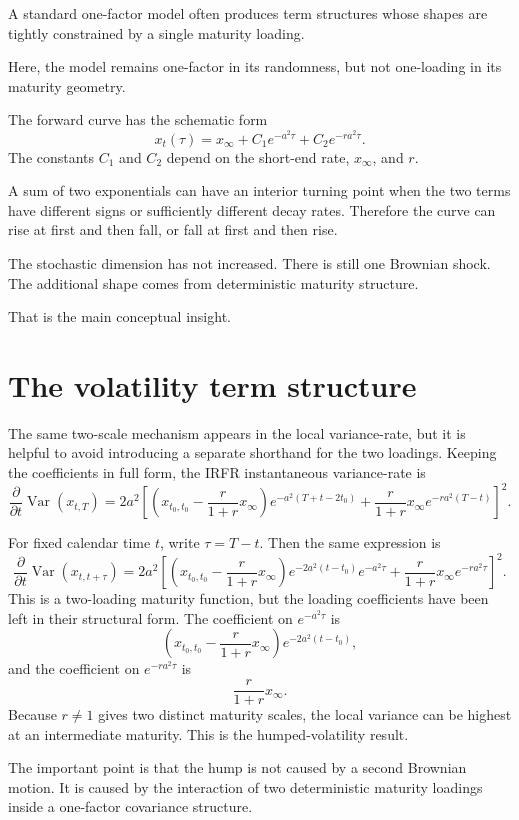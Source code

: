 \documentclass[11pt]{article}
\theoremstyle{plainbreak}
\begin{document}
A standard one-factor model often produces term structures whose shapes are tightly constrained by a single maturity loading.

Here, the model remains one-factor in its randomness, but not one-loading in its maturity geometry.

The forward curve has the schematic form
\[
x_t(\tau)=x_\infty+C_1 e^{-a^2\tau}+C_2 e^{-ra^2\tau}.
\]
The constants \(C_1\) and \(C_2\) depend on the short-end rate, \(x_\infty\), and \(r\).

A sum of two exponentials can have an interior turning point when the two terms have different signs or sufficiently different decay rates. Therefore the curve can rise at first and then fall, or fall at first and then rise.

The stochastic dimension has not increased. There is still one Brownian shock. The additional shape comes from deterministic maturity structure.

That is the main conceptual insight.


\section{The volatility term structure}

The same two-scale mechanism appears in the local variance-rate, but it is helpful to avoid introducing a separate shorthand for the two loadings. Keeping the coefficients in full form, the IRFR instantaneous variance-rate is
\[
\frac{\partial}{\partial t}\operatorname{Var}(x_{t,T})
=
2a^2
\left[
\left(
 x_{t_0,t_0}-\frac{r}{1+r}x_\infty
\right)
e^{-a^2(T+t-2t_0)}
+
\frac{r}{1+r}x_\infty e^{-ra^2(T-t)}
\right]^2.
\]

For fixed calendar time \(t\), write \(\tau=T-t\). Then the same expression is
\[
\frac{\partial}{\partial t}\operatorname{Var}(x_{t,t+\tau})
=
2a^2
\left[
\left(
 x_{t_0,t_0}-\frac{r}{1+r}x_\infty
\right)
e^{-2a^2(t-t_0)}e^{-a^2\tau}
+
\frac{r}{1+r}x_\infty e^{-ra^2\tau}
\right]^2.
\]
This is a two-loading maturity function, but the loading coefficients have been left in their structural form. The coefficient on \(e^{-a^2\tau}\) is
\[
\left(
 x_{t_0,t_0}-\frac{r}{1+r}x_\infty
\right)e^{-2a^2(t-t_0)},
\]
and the coefficient on \(e^{-ra^2\tau}\) is
\[
\frac{r}{1+r}x_\infty.
\]
Because \(r\neq 1\) gives two distinct maturity scales, the local variance can be highest at an intermediate maturity. This is the humped-volatility result.

The important point is that the hump is not caused by a second Brownian motion. It is caused by the interaction of two deterministic maturity loadings inside a one-factor covariance structure.
\end{document}
